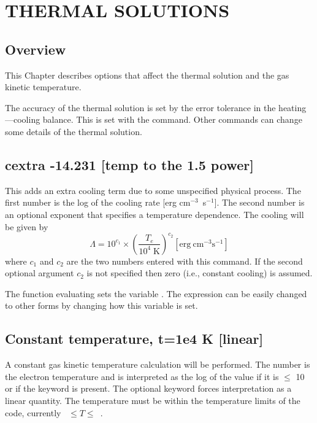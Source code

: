 \chapter{THERMAL SOLUTIONS}

\section{Overview}

This Chapter describes options that affect the thermal solution and the
gas kinetic temperature.

The accuracy of the thermal solution is set by the error tolerance in
the heating---cooling balance.
This is set with the  command.
Other commands can change some details of the thermal solution.

\section{cextra -14.231 [temp to the 1.5 power]}

This adds an extra cooling term due to some unspecified physical process.
The first number is the log of the cooling rate [erg cm$^{-3}$~s$^{-1}$].  The second
number is an optional exponent that specifies a temperature dependence.
The cooling will be given by
\begin{equation}
\Lambda  = 10^{c_1 }  \times \left( {\frac{{T_e }}{{10^4 \;{\mathrm{K}}}}}
\right)^{c_2 }
[\mathrm{erg\ cm}^{-3} \mathrm{s}^{-1}]%
\end{equation}
where $c_1$ and $c_2$ are the two numbers entered with this command. If the second
optional argument $c_2$ is not specified then zero
(i.e., constant cooling) is assumed.

The function evaluating  sets the
variable .
The expression can be easily changed to other forms by changing
how this variable is set.

\section{Constant temperature, t=1e4 K [linear]}

A constant gas kinetic temperature calculation will be performed.
The number
is the electron temperature and is interpreted
as the log
of the value if it is $\le$ 10 or if the keyword  is present.
The optional keyword  forces
interpretation as a linear quantity.
The temperature must be within the temperature limits
of the code, currently \TEMPLIMITLOW~$\leq T \leq$~\TEMPLIMITHIGH.

